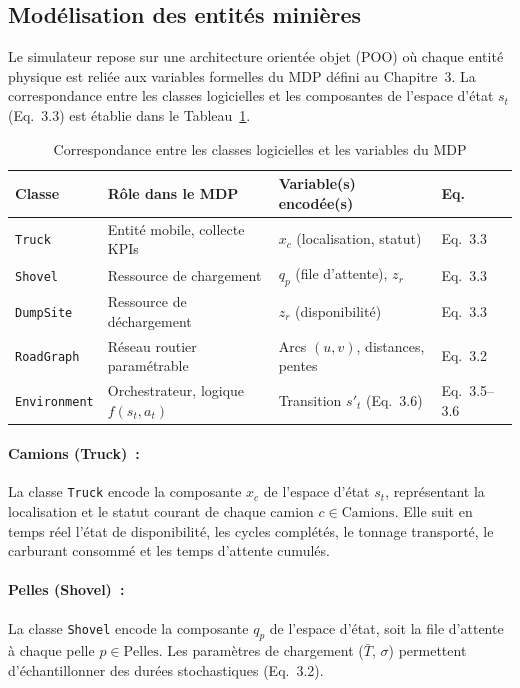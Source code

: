 \documentclass[11pt,a4paper]{report}
\begin{document}
\subsection{Modélisation des entités minières}
\label{sec:modelisation-entites}
Le simulateur repose sur une architecture orientée objet (POO) où chaque entité physique est reliée aux variables formelles du MDP défini au Chapitre~3. La correspondance entre les classes logicielles et les composantes de l'espace d'état $s_t$ (Eq.~3.3) est établie dans le Tableau~\ref{tab:mapping-classes-mdp}.

\begin{table}[H]
\centering
\caption{Correspondance entre les classes logicielles et les variables du MDP}
\label{tab:mapping-classes-mdp}
\begin{tabular}{llll}
\toprule
\textbf{Classe} & \textbf{Rôle dans le MDP} & \textbf{Variable(s) encodée(s)} & \textbf{Eq.} \\
\midrule
\texttt{Truck} & Entité mobile, collecte KPIs & $x_c$ (localisation, statut) & Eq.~3.3 \\
\texttt{Shovel} & Ressource de chargement & $q_p$ (file d'attente), $z_r$ & Eq.~3.3 \\
\texttt{DumpSite} & Ressource de déchargement & $z_r$ (disponibilité) & Eq.~3.3 \\
\texttt{RoadGraph} & Réseau routier paramétrable & Arcs $(u, v)$, distances, pentes & Eq.~3.2 \\
\texttt{Environment} & Orchestrateur, logique $f(s_t, a_t)$ & Transition $s'_t$ (Eq.~3.6) & Eq.~3.5--3.6 \\
\bottomrule
\end{tabular}
\end{table}

\paragraph{Camions (Truck)~:}
La classe \texttt{Truck} encode la composante $x_c$ de l'espace d'état $s_t$, représentant la localisation et le statut courant de chaque camion $c \in \text{Camions}$. Elle suit en temps réel l'état de disponibilité, les cycles complétés, le tonnage transporté, le carburant consommé et les temps d'attente cumulés.

\paragraph{Pelles (Shovel)~:}
La classe \texttt{Shovel} encode la composante $q_p$ de l'espace d'état, soit la file d'attente à chaque pelle $p \in \text{Pelles}$. Les paramètres de chargement ($\bar{T}$, $\sigma$) permettent d'échantillonner des durées stochastiques (Eq.~3.2).
\end{document}
